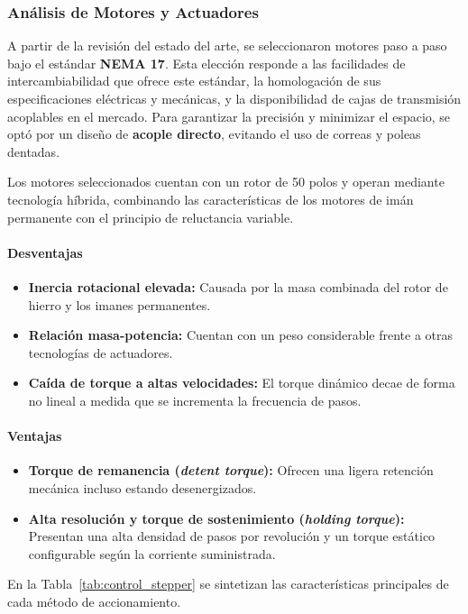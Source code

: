 \documentclass[12pt, a4paper]{article}
\begin{document}
\subsubsection{Análisis de Motores y Actuadores}
A partir de la revisión del estado del arte, se seleccionaron motores paso a paso bajo el estándar \textbf{NEMA 17}. Esta elección responde a las facilidades de intercambiabilidad que ofrece este estándar, la homologación de sus especificaciones eléctricas y mecánicas, y la disponibilidad de cajas de transmisión acoplables en el mercado. Para garantizar la precisión y minimizar el espacio, se optó por un diseño de \textbf{acople directo}, evitando el uso de correas y poleas dentadas.

Los motores seleccionados cuentan con un rotor de 50 polos y operan mediante tecnología híbrida, combinando las características de los motores de imán permanente con el principio de reluctancia variable. 

\paragraph{Desventajas}
\begin{itemize}
    \item \textbf{Inercia rotacional elevada:} Causada por la masa combinada del rotor de hierro y los imanes permanentes.
    \item \textbf{Relación masa-potencia:} Cuentan con un peso considerable frente a otras tecnologías de actuadores.
    \item \textbf{Caída de torque a altas velocidades:} El torque dinámico decae de forma no lineal a medida que se incrementa la frecuencia de pasos.
\end{itemize}

\paragraph{Ventajas}
\begin{itemize}
    \item \textbf{Torque de remanencia (\textit{detent torque}):} Ofrecen una ligera retención mecánica incluso estando desenergizados.
    \item \textbf{Alta resolución y torque de sostenimiento (\textit{holding torque}):} Presentan una alta densidad de pasos por revolución y un torque estático configurable según la corriente suministrada.
\end{itemize}

En la Tabla~\ref{tab:control_stepper} se sintetizan las características principales de cada método de accionamiento. 
\end{document}
